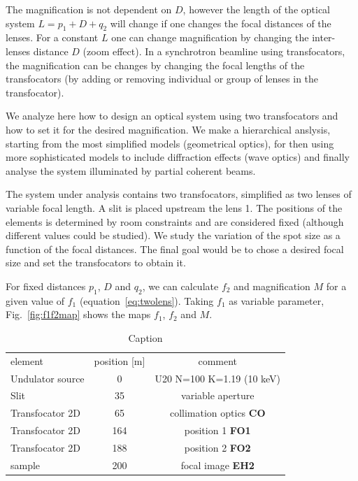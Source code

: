 \documentclass{iucr}              %
\begin{document}
The magnification is not dependent on $D$, however the length of the optical system $L=p_1+D+q_2$ will change if one changes the focal distances of the lenses. For a constant $L$ one can change magnification by changing the inter-lenses distance $D$ (zoom effect). In a synchrotron beamline using transfocators, the magnification can be changes by changing the focal lengths of the transfocators (by adding or removing individual or group of lenses in the transfocator).

We analyze here how to design an optical system using two transfocators and how to set it for the desired magnification. We make a hierarchical anslysis, starting from the most simplified models (geometrical optics), for then using more sophisticated models to include diffraction effects (wave optics) and finally analyse the system illuminated by partial coherent beams.

The system under analysis contains two transfocators, simplified as two lenses of variable focal length. A slit is placed upstream the lens 1. The positions of the elements is determined by room constraints and are considered fixed (although different values could be studied). We study the variation of the spot size as a function of the focal distances. The final goal would be to chose a desired focal size and set the transfocators to obtain it. 

For fixed distances $p_1$, $D$ and $q_2$, we can calculate $f_2$ and magnification $M$ for a given value of $f_1$ (equation~\ref{eq:twolens}). Taking $f_1$ as variable parameter,  Fig.~\ref{fig:f1f2map} shows the maps $f_1$, $f_2$ and $M$.

\begin{table}[]
    \label{table:id18parameters}
    \caption{Caption}
    \centering
    \begin{tabular}{l|c|c}
         element & position [m] & comment\\
         Undulator source& 0 & U20 N=100 K=1.19 (10 keV)\\
         Slit & 35 &
         variable aperture
         \\
         Transfocator 2D & 65 & 
         collimation optics {\bf CO}
         \\
         Transfocator 2D & 164 & position 1 {\bf FO1} \\
         Transfocator 2D & 188 & position 2 {\bf FO2}\\
         sample & 200 & focal image {\bf EH2}
    \end{tabular}


\end{table}
\end{document}
